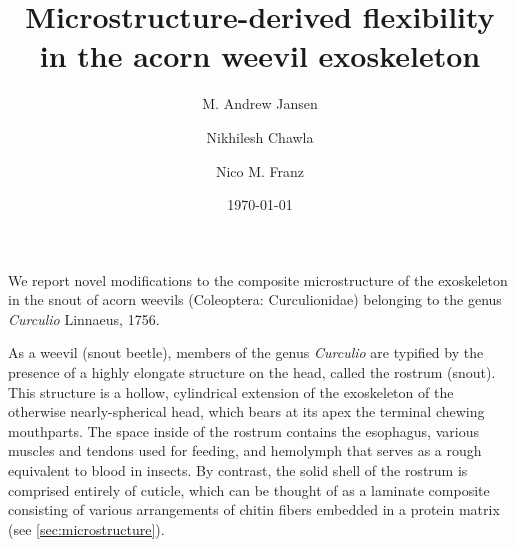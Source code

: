 \documentclass[twocolumn, linenumbers, superscriptaddress]{revtex4-1}
\begin{document}
	\begin{abstract}
		\blindtext
	\end{abstract}
	
	{\title{Microstructure-derived flexibility in the acorn weevil exoskeleton}
	
	\date{\today}
	
	\author{M. Andrew Jansen}
	\author{Nikhilesh Chawla}
	\author{Nico M. Franz}
		
	\maketitle
	}
	
	
		We report novel modifications to the composite microstructure of the exoskeleton in the snout of acorn weevils (Coleoptera: Curculionidae) belonging to the genus \textit{Curculio} Linnaeus, 1756.

		As a weevil (snout beetle), members of the genus \textit{Curculio} are typified by the presence of a highly elongate structure on the head, called the rostrum (snout). 
		This structure is a hollow, cylindrical extension of the exoskeleton of the otherwise nearly-spherical head, which bears at its apex the terminal chewing mouthparts. 
		The space inside of the rostrum contains the esophagus, various muscles and tendons used for feeding, and hemolymph that serves as a rough equivalent to blood in insects.
		By contrast, the solid shell of the rostrum is comprised entirely of cuticle, which can be thought of as a laminate composite consisting of various arrangements of chitin fibers embedded in a protein matrix (see \ref{sec:microstructure}).
		
\end{document}
